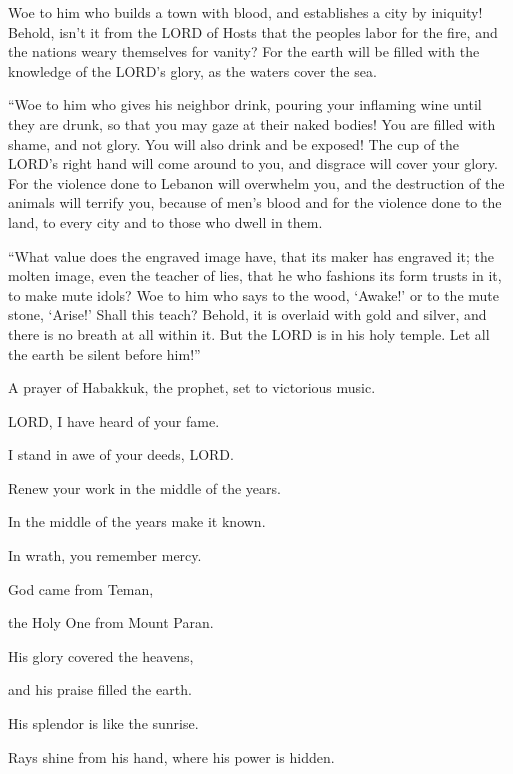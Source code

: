 \myverse{}Woe to him who builds a town with blood, and establishes a city
by iniquity! \myverse{}Behold, isn’t it from the LORD of Hosts that the peoples labor for the fire, and the nations weary themselves for vanity? \myverse{}For the earth will be filled with the knowledge of the LORD’s glory, as the waters cover the sea.


\myverse{}“Woe to him who gives his neighbor drink, pouring your inflaming wine until they are drunk, so that you may gaze at their naked bodies! \myverse{}You are filled with shame, and not glory. You will also drink and be exposed! The cup of the LORD’s right hand will come around to you, and disgrace will cover your glory. \myverse{}For the violence done to Lebanon will overwhelm you, and the destruction of the animals will terrify you, because of men’s blood and for the violence done to the land, to every city and to those who dwell in them.


\myverse{}“What value does the engraved image have, that its maker has engraved it; the molten image, even the teacher of lies, that he who fashions its form trusts in it, to make mute idols? \myverse{}Woe to him who says to the wood, ‘Awake!’ or to the mute stone, ‘Arise!’ Shall this teach? Behold, it is overlaid with gold and silver, and there is no breath at all within it. \myverse{}But the LORD is in his holy temple. Let all the earth be silent before him!”


\mychapter{} \myverse*{}A prayer of Habakkuk, the prophet, set to victorious music.


\myverse{}LORD, I have heard of your fame.

I stand in awe of your deeds, LORD.

Renew your work in the middle of the years.

In the middle of the years make it known.

In wrath, you remember mercy.


\myverse{}God came from Teman,

the Holy One from Mount Paran.

\vspace{\baselineskip} 

His glory covered the heavens,

and his praise filled the earth.


\myverse{}His splendor is like the sunrise.

Rays shine from his hand, where his power is hidden.


